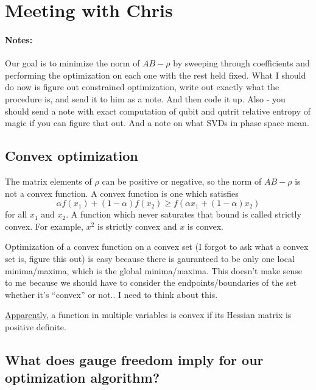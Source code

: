 \documentclass{report}
\begin{document}
\section{Meeting with Chris}

\paragraph{Notes:} Our goal is to minimize the norm of $AB-\rho$ by sweeping through coefficients and performing the optimization on each one with the rest held fixed. What I should do now is figure out constrained optimization, write out exactly what the procedure is, and send it to him as a note. And then code it up. Also - you should send a note with exact computation of qubit and qutrit relative entropy of magic if you can figure that out. And a note on what SVDs in phase space mean. 

\subsection{Convex optimization}

The matrix elements of $\rho$ can be positive or negative, so the norm of $AB-\rho$ is not a convex function. A convex function is one which satisfies 
\begin{equation}\alpha f(x_1)+(1-\alpha)f(x_2)\geq f(\alpha x_1+(1-\alpha)x_2)\end{equation}
for all $x_1$ and $x_2$. A function which never saturates that bound is called strictly convex. For example, $x^2$ is strictly convex and $x$ is convex. 

Optimization of a convex function on a convex set (I forgot to ask what a convex set is, \todo figure this out) is easy because there is gauranteed to be only one local minima/maxima, which is the global minima/maxima. \todo This doesn't make sense to me because we should have to consider the endpoints/boundaries of the set whether it's ``convex'' or not.. I need to think about this.

\href{https://mat.gsia.cmu.edu/classes/QUANT/NOTES/chap4/node3.html#SECTION00210000000000000000}{Apparently}, a function in multiple variables is convex if its Hessian matrix is positive definite. 

\subsection{What does gauge freedom imply for our optimization algorithm?}
\end{document}

